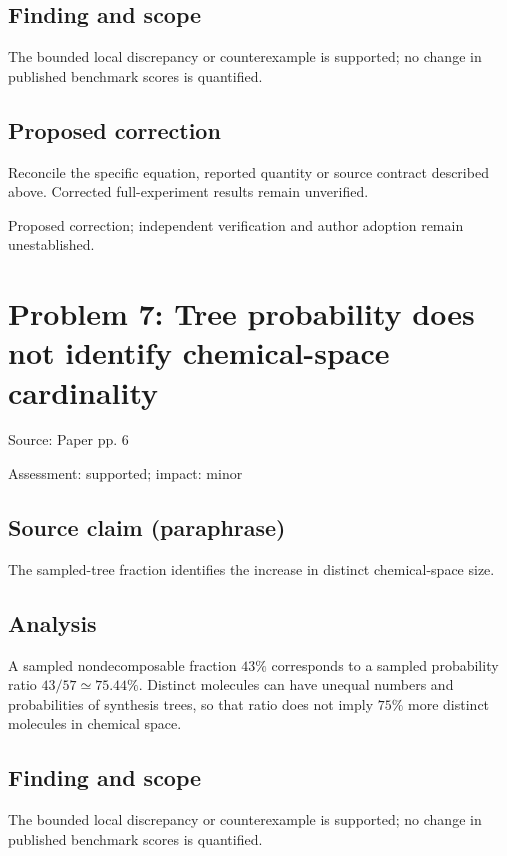 \documentclass[11pt]{article}
\begin{document}
\subsection*{Finding and scope}

The bounded local discrepancy or counterexample is supported; no change in published benchmark scores is quantified.

\subsection*{Proposed correction}

Reconcile the specific equation, reported quantity or source contract described above. Corrected full-experiment results remain unverified.

Proposed correction; independent verification and author adoption remain unestablished.

\section*{Problem 7: Tree probability does not identify chemical-space cardinality}

Source: Paper pp. 6

Assessment: supported; impact: minor

\subsection*{Source claim (paraphrase)}

The sampled-tree fraction identifies the increase in distinct chemical-space size.

\subsection*{Analysis}

A sampled nondecomposable fraction \(43\%\) corresponds to a sampled probability ratio \(43/57\simeq75.44\%\). Distinct molecules can have unequal numbers and probabilities of synthesis trees, so that ratio does not imply \(75\%\) more distinct molecules in chemical space.

\subsection*{Finding and scope}

The bounded local discrepancy or counterexample is supported; no change in published benchmark scores is quantified.
\end{document}
